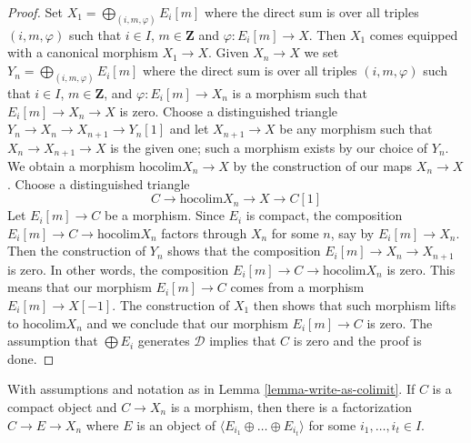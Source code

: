\begin{proof}
Set $X_1 = \bigoplus_{(i, m, \varphi)} E_i[m]$ where the direct sum is over
all triples $(i, m, \varphi)$ such that $i \in I$, $m \in \mathbf{Z}$
and $\varphi : E_i[m] \to X$. Then $X_1$ comes equipped with a canonical
morphism $X_1 \to X$. Given $X_n \to X$ we set
$Y_n = \bigoplus_{(i, m, \varphi)} E_i[m]$ where the direct sum is over
all triples $(i, m, \varphi)$ such that $i \in I$, $m \in \mathbf{Z}$, and
$\varphi : E_i[m] \to X_n$ is a morphism such that $E_i[m] \to X_n \to X$
is zero. Choose a distinguished triangle
$Y_n \to X_n \to X_{n + 1} \to Y_n[1]$
and let $X_{n + 1} \to X$ be any morphism such that $X_n \to X_{n + 1} \to X$
is the given one; such a morphism exists by our choice of $Y_n$.
We obtain a morphism $\text{hocolim} X_n \to X$ by the construction
of our maps $X_n \to X$. Choose a distinguished triangle
$$
C \to \text{hocolim} X_n \to X \to C[1]
$$
Let $E_i[m] \to C$ be a morphism. Since $E_i$ is compact, the
composition $E_i[m] \to C \to \text{hocolim} X_n$ factors through
$X_n$ for some $n$, say by $E_i[m] \to X_n$. Then the
construction of $Y_n$ shows that the composition
$E_i[m] \to X_n \to X_{n + 1}$ is zero. In other words, the composition
$E_i[m] \to C \to \text{hocolim} X_n$ is zero. This means that our
morphism $E_i[m] \to C$ comes from a morphism $E_i[m] \to X[-1]$.
The construction of $X_1$ then shows that such morphism lifts to
$\text{hocolim} X_n$ and we conclude that our morphism $E_i[m] \to C$
is zero. The assumption that $\bigoplus E_i$ generates $\mathcal{D}$
implies that $C$ is zero and the proof is done.
\end{proof}

\begin{lemma}
\label{lemma-factor-through}
With assumptions and notation as in Lemma \ref{lemma-write-as-colimit}.
If $C$ is a compact object and $C \to X_n$ is a morphism, then
there is a factorization $C \to E \to X_n$ where
$E$ is an object of $\langle E_{i_1} \oplus \ldots \oplus E_{i_t} \rangle$
for some $i_1, \ldots, i_t \in I$.
\end{lemma}

